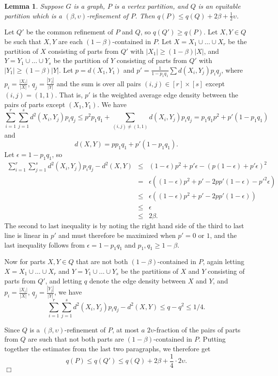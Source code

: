 \documentclass[11pt]{article}
\newtheorem{lemma}{Lemma}[section]
\newenvironment{proof}
      {\medskip\noindent{\bf Proof:}\hspace{1mm}}
      {\hfill$\Box$\medskip}
\begin{document}
\begin{lemma}\label{almostref}
Suppose $G$ is a graph, $P$ is a vertex partition, and $Q$ is an equitable
partition which is a $(\beta,\upsilon)$-refinement of $P$. Then $q(P) \leq
q(Q)+2\beta+\frac{1}{2}\upsilon$.
\end{lemma}
\begin{proof}
Let $Q'$ be the common refinement of $P$ and $Q$, so $q(Q') \geq q(P)$. Let
$X,Y \in Q$ be such that $X,Y$ are each $(1-\beta)$-contained in $P$. Let
$X=X_1 \cup \ldots \cup X_r$ be the partition of $X$ consisting of parts from
$Q'$ with $|X_1| \geq (1-\beta)|X|$, and $Y=Y_1 \cup \ldots \cup Y_s$ be the
partition of $Y$ consisting of parts from $Q'$ with $|Y_1| \geq (1-\beta)|Y|$.
Let $p=d(X_1,Y_1)$ and $p'=\frac{1}{1-p_1q_1}\sum d(X_i,Y_j)p_iq_j$, where
$p_i=\frac{|X_i|}{|X|}$, $q_j=\frac{|Y_j|}{|Y|}$ and the sum is over all pairs
$(i,j) \in [r] \times [s]$ except $(i,j)=(1,1)$. That is, $p'$ is the weighted
average edge density between the pairs of parts except $(X_1,Y_1)$. We have
$$\sum_{i=1}^r\sum_{j=1}^s d^2(X_i,Y_j)p_iq_j \leq p^2p_1q_1+\sum_{(i,j) \not =
(1,1)} d(X_i,Y_j)p_iq_j = p_1q_1p^2+p'(1-p_1q_1)$$
and $$d(X,Y)=pp_1q_1+p'(1-p_1q_1).$$
Let $\epsilon=1-p_1q_1$, so \begin{eqnarray*}
\sum_{i=1}^r\sum_{j=1}^s d^2(X_i,Y_j)p_iq_j-d^2(X,Y) & \leq &
(1-\epsilon)p^2+p'\epsilon-\left(p(1-\epsilon)+p'\epsilon\right)^2 \\ & = &
\epsilon \left((1-\epsilon)p^2+p'-2pp'(1-\epsilon)-p'^2\epsilon\right) \\ &
\leq & \epsilon \left((1-\epsilon)p^2+p'-2pp'(1-\epsilon)\right) \\ &  \leq &
\epsilon \\ & \leq & 2\beta.\end{eqnarray*}
The second to last inequality is by noting the right hand side of the third to
last line is linear in $p'$ and must therefore be maximized when $p'=0$ or $1$,
and the last inequality follows from $\epsilon=1-p_1q_1$ and $p_1,q_1 \geq
1-\beta$.

Now for parts $X,Y \in Q$ that are not both $(1-\beta)$-contained in $P$, again
letting $X=X_1 \cup \ldots \cup X_r$ and $Y=Y_1 \cup \ldots \cup Y_s$ be the
partitions of $X$ and $Y$ consisting of parts from $Q'$, and letting $q$ denote
the edge density between $X$ and $Y$, and  $p_i=\frac{|X_i|}{|X|}$,
$q_j=\frac{|Y_j|}{|Y|}$,  we have
$$\sum_{i=1}^r\sum_{j=1}^s d^2(X_i,Y_j)p_iq_j - d^2(X,Y)  \leq q-q^2 \leq
1/4.$$

Since $Q$ is a $(\beta,\upsilon)$-refinement of $P$, at most $a$ 
$2\upsilon$-fraction of the pairs of parts from $Q$ are such that not both
parts are $(1-\beta)$-contained in $P$. Putting together the estimates from the
last two paragraphs, we therefore get $$q(P) \leq q(Q') \leq
q(Q)+2\beta+\frac{1}{4} \cdot 2\upsilon.$$
\end{proof}
\end{document}
